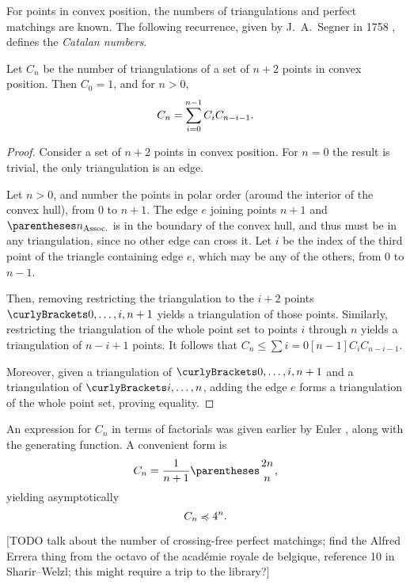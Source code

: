 \documentclass[10pt, a4paper, twoside]{basestyle}
\begin{document}
For points in convex position, the numbers of triangulations and perfect matchings are known.
The following recurrence, given by J.~A.~Segner in 1758 \cite{Segner1758}, defines the \emph{Catalan numbers}.
\begin{theorem}[Segner]
Let $C_n$ be the number of triangulations of a set of $n+2$ points in convex position.
Then $C_0 = 1$, and for $n>0$, \begin{equation}
C_n = \sum {i=0}[n-1] C_i C_{n-i-1}\text. \label{CatalanRecurrence}
\end{equation}
\begin{proof}
Consider a set of $n+2$ points in convex position.
For $n=0$ the result is trivial, the only triangulation is an edge.

Let $n > 0$, and number the points in polar order (around the interior of the convex hull), from $0$ to $n+1$.
The edge $e$ joining points $n+1$ and $\pa{n}$ is in the boundary of the convex hull, and thus must
be in any triangulation, since no other edge can cross it. Let $i$ be the index of the third point of the
triangle containing edge $e$, which may be any of the others, from $0$ to $n-1$.

Then, removing restricting the triangulation to the $i+2$ points $\set{0,\dotsc,i,n+1}$ yields a triangulation
of those points.
Similarly, restricting the triangulation of the whole point set to points $i$ through $n$ yields a triangulation of
$n-i+1$ points. It follows that $C_n \leq \sum {i=0}[n-1] C_i C_{n-i-1}$.

Moreover, given a triangulation of $\set{0,\dotsc,i,n+1}$ and a triangulation of $\set{i,\dotsc, n}$,
adding the edge $e$ forms a triangulation of the whole point set, proving equality.
\end{proof}
\end{theorem}
An expression for $C_n$ in terms of factorials was given earlier by Euler \cite{Euler1751}, along
with the generating function.
A convenient form is\begin{equation}
C_n = \frac{1}{n+1} \binom {2n} {n}\text,
\end{equation}
yielding asymptotically
\begin{equation}
C_n \preccurlyeq 4^n\text.
\end{equation}

[TODO talk about the number of crossing-free perfect matchings; find the Alfred Errera thing from the octavo
of the académie royale de belgique, reference 10 in Sharir--Welzl; this might require a trip to the library?]
\end{document}
